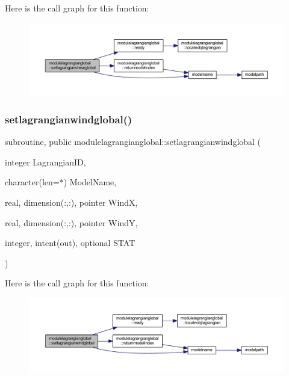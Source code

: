Here is the call graph for this function\+:\nopagebreak
\begin{figure}[H]
\begin{center}
\leavevmode
\includegraphics[width=350pt]{namespacemodulelagrangianglobal_adc48b1a085b61254391390b4d5e28fa0_cgraph}
\end{center}
\end{figure}
\mbox{\label{namespacemodulelagrangianglobal_ac53f073d4f18ccb94ad14b1b035b9bd6}} 
\subsubsection{\texorpdfstring{setlagrangianwindglobal()}{setlagrangianwindglobal()}}
{\footnotesize\ttfamily subroutine, public modulelagrangianglobal\+::setlagrangianwindglobal (\begin{DoxyParamCaption}\item[{integer}]{Lagrangian\+ID,  }\item[{character(len=$\ast$)}]{Model\+Name,  }\item[{real, dimension(\+:,\+:), pointer}]{WindX,  }\item[{real, dimension(\+:,\+:), pointer}]{WindY,  }\item[{integer, intent(out), optional}]{S\+T\+AT }\end{DoxyParamCaption})}

Here is the call graph for this function\+:\nopagebreak
\begin{figure}[H]
\begin{center}
\leavevmode
\includegraphics[width=350pt]{namespacemodulelagrangianglobal_ac53f073d4f18ccb94ad14b1b035b9bd6_cgraph}
\end{center}
\end{figure}
\mbox{\label{namespacemodulelagrangianglobal_a7a50386c8ebd93860ae227d772932cd8}} 
